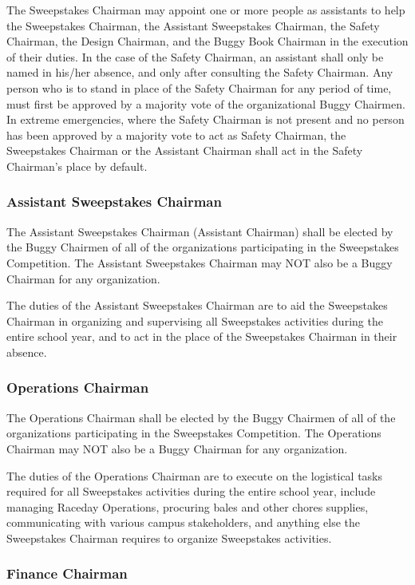 	The Sweepstakes Chairman may appoint one or more people as assistants to help the Sweepstakes Chairman, the Assistant Sweepstakes Chairman, the Safety Chairman, the Design Chairman, and the Buggy Book Chairman in the execution of their duties. In the case of the Safety Chairman, an assistant shall only be named in his/her absence, and only after consulting the Safety Chairman. Any person who is to stand in place of the Safety Chairman for any period of time, must first be approved by a majority vote of the organizational Buggy Chairmen. In extreme emergencies, where the Safety Chairman is not present and no person has been approved by a majority vote to act as Safety Chairman, the Sweepstakes Chairman or the Assistant Chairman shall act in the Safety Chairman's place by default.

\subsubsection{Assistant Sweepstakes Chairman}

	The Assistant Sweepstakes Chairman (Assistant Chairman) shall be elected by the Buggy Chairmen of all of the organizations participating in the Sweepstakes Competition. The Assistant Sweepstakes Chairman may NOT also be a Buggy Chairman for any organization.

	The duties of the Assistant Sweepstakes Chairman are to aid the Sweepstakes Chairman in organizing and supervising all Sweepstakes activities during the entire school year, and to act in the place of the Sweepstakes Chairman in their absence.

\subsubsection{Operations Chairman}

	The Operations Chairman shall be elected by the Buggy Chairmen of all of the organizations participating in the Sweepstakes Competition. The Operations Chairman may NOT also be a Buggy Chairman for any organization.

	The duties of the Operations Chairman are to execute on the logistical tasks required for all Sweepstakes activities during the entire school year, include managing Raceday Operations, procuring bales and other chores supplies, communicating with various campus stakeholders, and anything else the Sweepstakes Chairman requires to organize Sweepstakes activities.

\subsubsection{Finance Chairman}

